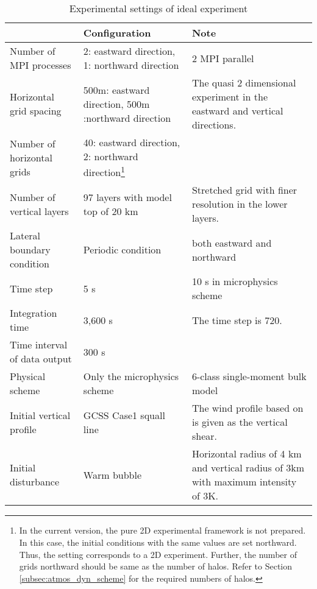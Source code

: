 \begin{table}[htb]
\begin{minipage}{150mm}
\begin{center}
\caption{Experimental settings of ideal experiment}
\begin{tabularx}{150mm}{|l|X|X|} \hline
 \rowcolor[gray]{0.9} ~~ & Configuration & Note \\ \hline
 Number of MPI processes& 2: eastward direction, 1: northward direction & 2 MPI parallel \\ \hline
 Horizontal grid spacing & 500m: eastward direction, 500m :northward direction & The quasi 2 dimensional experiment in the eastward and vertical directions. \\ \hline
 Number of horizontal grids & 40: eastward direction, 2: northward direction\footnote{In the current version, the pure 2D experimental framework is not prepared. In this case, the initial conditions with the same values are set northward. Thus, the setting corresponds to a 2D experiment. Further, the number of grids northward should be same as the number of halos. Refer to Section \ref{subsec:atmos_dyn_scheme} for the required numbers of halos.} &  \\ \hline
 Number of vertical layers & 97 layers with model top of 20 km & Stretched grid with finer resolution in the lower layers. \\ \hline
 Lateral boundary condition & Periodic condition & both eastward and northward \\ \hline
 Time step & 5 s      &  10 s in microphysics scheme\\ \hline
 Integration time     & 3,600 s & The time step is 720.\\ \hline
 Time interval of data output & 300 s  &  \\ \hline
 Physical scheme & Only the microphysics scheme &
 6-class single-moment bulk model \citep{tomita_2008} \\ \hline
 Initial vertical profile & GCSS Case1 squall line \citep{Redelsperger2000}&
 The wind profile based on \citet{Ooyama_2001} is given as the vertical shear. \\ \hline
 Initial disturbance & Warm bubble & Horizontal radius of 4 km and
 vertical radius of 3km with  maximum intensity of 3K.\\ \hline
\end{tabularx}
\label{tab:setting_ideal}
\end{center}
\end{minipage}
\end{table}


